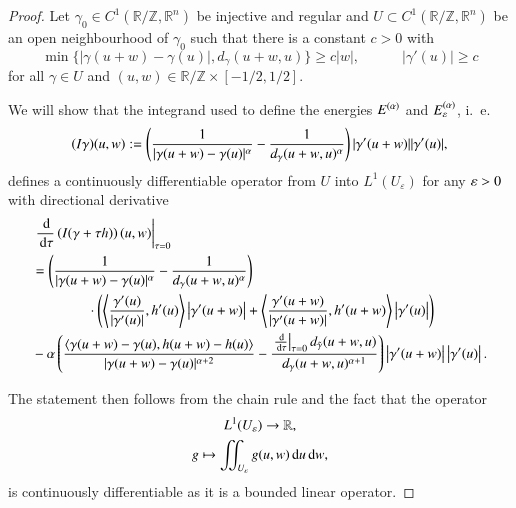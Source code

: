 
\begin{proof}
Let $\gamma_0 \in C^1(\mathbb R / \mathbb Z, \mathbb R^n)$ be injective and regular and 
$U \subset C^1(\mathbb R / \mathbb Z, \mathbb R^n)$ be an open neighbourhood of $\gamma_0$ such that
there is a constant $c >0$ with
\begin{equation} \label{eq:fundamentalEstimates}
 \min\{|\gamma(u+w) - \gamma(u)|, d_\gamma(u+w,u)\}  \geq c |w|, \quad \quad
 \quad|\gamma'(u)| \geq c
\end{equation}
for all $\gamma \in U$ and $(u,w) \in \mathbb R / \mathbb Z \times [-1/2,1/2]$.

We will show that the integrand used to define the energies $E^{(\alpha)}$ and $E_{\varepsilon}^{(\alpha)}$, i.~e.\@
\begin{equation*}
 (I\gamma) (u,w) := \left(\frac 1 {|\gamma(u+w) - \gamma(u)|^\alpha} - \frac 1 {d_\gamma(u+w,u)^\alpha} \right) 
  |\gamma'(u+w)| |\gamma'(u)|,
\end{equation*}
defines a continuously differentiable operator from $U$ into
$L^1(U_\varepsilon)$  for any $\varepsilon>0$ with directional 
derivative
\begin{equation}\label{eq:derivativeOfIntegrand}
\begin{split}
 &\left. \frac {\,\mathrm{d}}{\,\mathrm{d}\tau} \left(I(\gamma + \tau h) \right)(u,w) \right|_{\tau =0} \\
  &=
 \left(\frac 1 {|\gamma(u+w) - \gamma(u)|^\alpha} - \frac 1 {d_\gamma(u+w,u)^\alpha} \right)  
\\
& \qquad \qquad \cdot 
  \left( \left\langle \frac{\gamma'(u)}{|\gamma'(u)|}, h'(u) \right\rangle\left|{\gamma}'(u+w)\right| +  
  \left\langle \frac{\gamma'(u+w)}{|\gamma'(u+w)|}, h'(u+w) \right\rangle\left|{\gamma}'(u)\right|\right) \\
  & - \alpha  \left(\frac{\left\langle {\gamma}(u+w)-{\gamma}(u) ,{h}(u+w)-{h}(u) \right\rangle }{|{\gamma}(u+w)-{\gamma}(u)|^{\alpha+2}}
    -\frac{ \left.\frac {\,\mathrm{d}} {\,\mathrm{d}\tau}\right|_{\tau=0}d_{\tilde\gamma}(u+w,u)}{d_\gamma(u+w,u)^{\alpha+1}}\right)
  \left|{\gamma}'(u+w)\right|\left|{\gamma}'(u)\right|.
\end{split}
\end{equation}


The statement then follows from the chain rule and the fact that the operator
\begin{gather*}
 L^1(U_\varepsilon) \to \mathbb R, \\
 g \mapsto \iint_{U_\varepsilon} g(u,w) \,\mathrm{d} u\,\mathrm{d} w,
\end{gather*}
is continuously differentiable as it is a bounded linear operator.
 

\end{proof}
